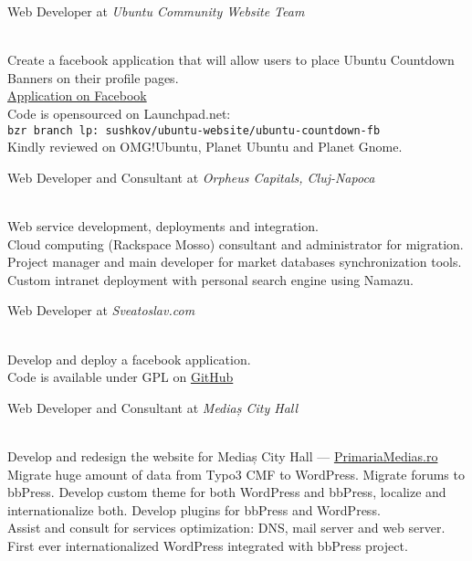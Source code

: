 \documentclass[10pt, a4paper]{article}
\newcommand{\years}[1]{\marginnote{\scriptsize #1}}
\begin{document}
\years{2010}Web Developer at \emph{Ubuntu Community Website Team}
\begin{footnotesize}
\\
Create a facebook application that will allow users to place Ubuntu Countdown Banners on their profile pages.\\
\href{http://www.facebook.com/apps/application.php?id=115718008445537}{Application on Facebook}\\
Code is opensourced on Launchpad.net:\\
\texttt{bzr branch lp:~sushkov/ubuntu-website/ubuntu-countdown-fb}\\
Kindly reviewed on OMG!Ubuntu, Planet Ubuntu and Planet Gnome.
\end{footnotesize}

\years{2009}Web Developer and Consultant at \emph{Orpheus Capitals, Cluj-Napoca}
\begin{footnotesize}
\\
Web service development, deployments and integration.\\
Cloud computing (Rackspace Mosso) consultant and administrator for migration.\\
Project manager and main developer for market databases synchronization tools.\\
Custom intranet deployment with personal search engine using Namazu.
\end{footnotesize}

\years{2009}Web Developer at \emph{Sveatoslav.com}
\begin{footnotesize}
\\
Develop and deploy a facebook application.\\
Code is available under GPL on \href{http://github.com/stas/facebook-ideas-app}{GitHub}
\end{footnotesize}

\years{2007}Web Developer and Consultant at \emph{Mediaș City Hall}
\begin{footnotesize}
\\
 Develop and redesign the website for Mediaș City Hall --- \href{http://primariamedias.ro}{PrimariaMedias.ro}\\
 Migrate huge amount of data from Typo3 CMF to WordPress. Migrate forums to bbPress. Develop custom theme for both WordPress and bbPress, localize and internationalize both. Develop plugins for bbPress and WordPress.\\
 Assist and consult for services optimization: DNS, mail server and web server.\\
 First ever internationalized WordPress integrated with bbPress project.
\end{footnotesize}
\end{document}
